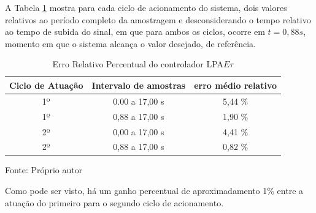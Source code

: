 A Tabela \ref{tab:ErroLPAEt} mostra para cada ciclo de 
acionamento do sistema, 
dois valores relativos ao período completo da amostragem e
desconsiderando o tempo relativo ao tempo de subida do sinal,
em que para ambos os ciclos, ocorre em $t = 0,88 s$, 
momento em que o sistema alcança o valor desejado, 
de referência.


\begin{table}[h]%
\centering
\caption{Erro Relativo Percentual do controlador LPA$E\tau$}
\label{tab:ErroLPAEt}

\begin{tabular}{c|c|c}
\hline
Ciclo de Atuação & Intervalo de amostras  &  erro médio relativo \\ \hline
\hline
1º & 0.00 a 17,00 s &  5,44 \% \\ \hline
1º & 0,88 a 17,00 s &  1,90 \% \\ \hline
2º & 0,00 a 17,00 s &  4,41 \% \\ \hline
2º & 0,88 a 17,00 s &  0,82 \% \\ \hline
\end{tabular}

{\vspace{0.2cm} \small Fonte: Próprio autor}
\end{table}

Como pode ser visto, há um ganho percentual de 
aproximadamento 1\% entre a atuação do primeiro 
para o segundo ciclo de acionamento. 









